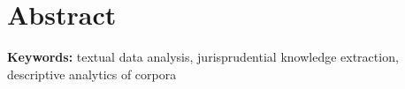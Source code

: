 \chapter*{Abstract}

\textbf{Keywords:} textual data analysis, jurisprudential knowledge extraction, descriptive analytics of corpora



